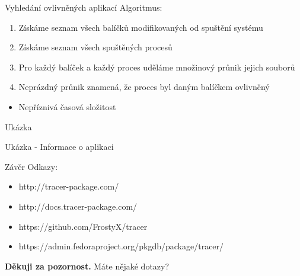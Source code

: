 \documentclass{beamer}
\newcommand{\separator}{\vspace{15pt}}
\begin{document}
	\begin{frame}{Vyhledání ovlivněných aplikací}
		Algoritmus:
		\begin{enumerate}
			\item Získáme seznam všech balíčků modifikovaných od spuštění systému
			\item Získáme seznam všech spuštěných procesů
			\item Pro každý balíček a každý proces uděláme množinový průnik jejich souborů
			\item Neprázdný průnik znamená, že proces byl daným balíčkem ovlivněný
		\end{enumerate}
		\separator
		\begin{itemize}
			\item Nepříznivá časová složitost
		\end{itemize}
	\end{frame}


	\begin{frame}{Ukázka}
		
	\end{frame}

	\begin{frame}{Ukázka - Informace o aplikaci}
		
	\end{frame}

	\begin{frame}{Závěr}
		Odkazy:
		\begin{itemize}
			\item http://tracer-package.com/
			\item http://docs.tracer-package.com/
			\item https://github.com/FrostyX/tracer
			\item https://admin.fedoraproject.org/pkgdb/package/tracer/
		\end{itemize}
		\vspace{70pt}
		\centerline{\textbf{Děkuji za pozornost.} Máte nějaké dotazy?}
	\end{frame}
\end{document}
